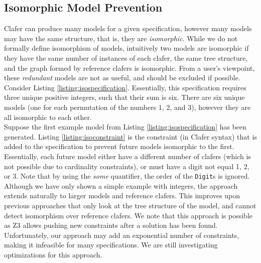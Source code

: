 \documentclass{easychair}
\begin{document}
\subsection{Isomorphic Model Prevention}
\label{isomorphism}
Clafer can produce many models for a given specification, however many models may have the same structure, that is, they are \textit{isomorphic}. While we do not formally define isomorphism of models, intuitively two models are isomorphic if they have the same number of instances of each clafer, the same tree structure, and the graph formed by reference clafers is isomorphic. From a user's viewpoint,  these \textit{redundant} models are not as useful, and should be excluded if possible. Consider Listing \ref{listing:isospecification}. Essentially, this specification requires three unique positive integers, such that their sum is six. There are six unique models (one for each permutation of the numbers 1, 2, and 3), however they are all isomorphic to each other. \\
\indent Suppose the first example model from Listing \ref{listing:isospecification} has been generated. Listing \ref{listing:isoconstraint} is the constraint (in Clafer syntax) that is added to the specification to prevent future models isomorphic to the first. Essentially, each future model either have a different number of clafers (which is not possible due to cardinality constraints), or must have a digit not equal 1, 2, or 3. Note that by using the \textit{some} quantifier, the order of the \texttt{Digit}s is ignored. \\
\indent Although we have only shown a simple example with integers, the approach extends naturally to larger models and reference clafers. This improves upon previous approaches that only look at the tree structure of the model, and cannot detect isomorphism over reference clafers. We note that this approach is possible as Z3 allows pushing new constraints after a solution has been found. Unfortunately, our approach may add an exponential number of constraints, making it infeasible for many specifications. We are still investigating optimizations for this approach.
\end{document}
